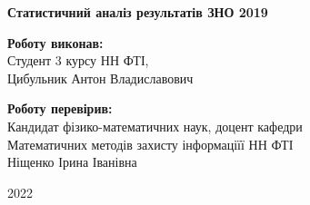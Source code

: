 \begin{titlepage}
    \begin{center}
        \begin{spacing}{1.5}
            \textbf{\Large{Статистичний аналіз результатів ЗНО 2019}}
        \end{spacing}
    \end{center}
    
    \vspace{\fill}
    
    \newlength{\maxname}

    \hfill\parbox{\maxname}{
        \begin{spacing}{1.1}
            \small{\textbf{Роботу виконав:}} \\ 
            \small{Студент 3 курсу НН ФТІ,} \\
            \small{Цибульник Антон Владиславович} \\
        \end{spacing}
    }

    \hfill\parbox{\maxname}{
        \begin{spacing}{1.1}
            \small{\textbf{Роботу перевірив:}} \\ 
            \small{Кандидат фізико-математичних наук, доцент кафедри} \\
            \small{Математичних методів захисту інформаціїї НН ФТІ} \\
            \small{Ніщенко Ірина Іванівна} \\
        \end{spacing}
    }

    \vspace{0.5cm}

    \begin{center}
        \small{2022}
    \end{center}
    
\end{titlepage}